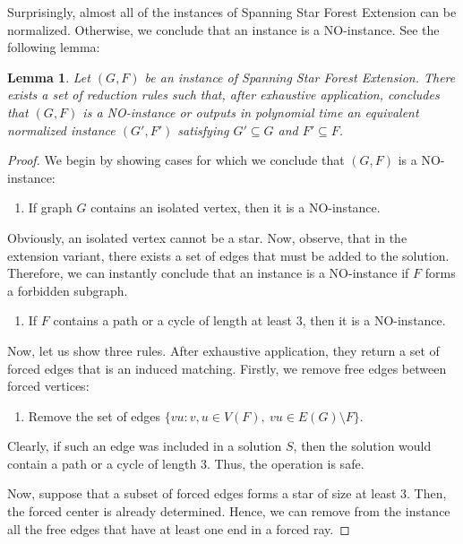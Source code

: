 \documentclass[en]{pracamgr}
\newtheorem{lemma}{Lemma}
\theoremstyle{definition}
\newcommand{\ssfep}{{\sc Spanning Star Forest Extension}}
\begin{document}
Surprisingly, almost all of the instances of \ssfep{} can be normalized. Otherwise, we conclude that an instance is a NO-instance. See the following lemma:

\begin{lemma}
	Let $(G,F)$ be an instance of \ssfep{}. There exists a set of reduction rules such that, after exhaustive application, concludes that $(G,F)$ is a NO-instance or outputs in polynomial time an equivalent normalized instance $(G',F')$ satisfying $G' \subseteq G$ and $F' \subseteq F$.
\end{lemma}

\begin{proof}
	We begin by showing cases for which we conclude that $(G,F)$ is a NO-instance:
	\begin{enumerate}[leftmargin=*,label=\textbf{Reduction \arabic{enumi}},labelindent=0pt]
		\item If graph $G$ contains an isolated vertex, then it is a NO-instance.
	\end{enumerate}
	
	Obviously, an isolated vertex cannot be a star. Now, observe, that in the extension variant, there exists a set of edges that must be added to the solution. Therefore, we can instantly conclude that an instance is a NO-instance if $F$ forms a forbidden subgraph.
	
	\begin{enumerate}[leftmargin=*,label=\textbf{Reduction \arabic{enumi}},labelindent=0pt,resume]
		\item If $F$ contains a path or a cycle of length at least $3$, then it is a NO-instance.
	\end{enumerate}
	
	Now, let us show three rules. After exhaustive application, they return a set of forced edges that is an induced matching. Firstly, we remove free edges between forced vertices:	

	\begin{enumerate}[leftmargin=*,label=\textbf{Reduction \arabic{enumi}},labelindent=0pt,resume]
		\item Remove the set of edges $\{vu: v,u \in V(F),\ vu \in E(G) \setminus F\}$.
	\end{enumerate}
	Clearly, if such an edge was included in a solution $S$, then the solution would contain a path or a cycle of length $3$. Thus, the operation is safe. 
	
	Now, suppose that a subset of forced edges forms a star of size at least $3$. Then, the forced center is already determined. Hence, we can remove from the instance all the free edges that have at least one end in a forced ray. 
	

\end{proof}
\end{document}
